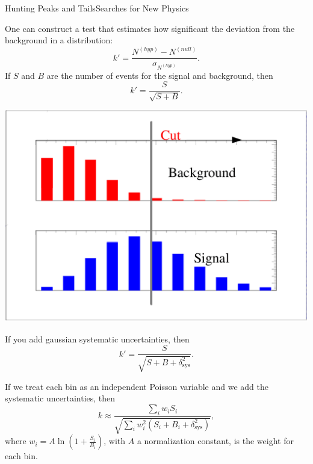 \documentclass{../bredelebeamer}
\begin{document}
\begin{frame}{Hunting Peaks and Tails}{Searches for New Physics}
	\begin{multicols}{2}
		One can construct a test that estimates how significant the deviation from the background in a distribution:
		$$
		k'=\frac{N^{(hyp)}-N^{(null)}}{\sigma_{N^{(hyp)}}}.
		$$
		\vfill
		If $S$ and $B$ are the number of events for the signal and background, then
		$$
		k'=\frac{S}{\sqrt{S+B}}.
		$$

		\begin{center}
			\includegraphics[width=.75\linewidth]{simpleopt-06.png}
		\end{center}
		\pause 
		If you add gaussian systematic uncertainties, then
		$$
		k'=\frac{S}{\sqrt{S+B+\delta_{\text{sys}}^2}}.
		$$

		\pause

		If we treat each bin as an independent Poisson variable and we add the systematic uncertainties, then
		$$
		\boxed{
			k \approx \frac{\sum_i w_i S_i}{\sqrt{\sum_i w_i^2 (S_i+B_i+\delta_{\text{sys}}^2)}},
		}
		$$
		where $w_i = A \ln \left(1+\frac{S_i}{B_i}\right)$, with $A$ a normalization constant, is the weight for each bin.
	\end{multicols}

\end{frame}
\end{document}
